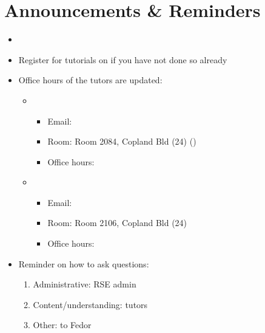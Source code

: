 \documentclass[letterpaper,10pt,english]{jupyterBook}
\begin{document}
\section{Announcements \& Reminders}
\label{\detokenize{02.optimization_intro:announcements-reminders}}\begin{itemize}
\item {} 
\sphinxAtStartPar
{}

\item {} 
\sphinxAtStartPar
Register for tutorials on  if you have not done so already

\item {} 
\sphinxAtStartPar
Office hours of the tutors are updated:
\begin{itemize}
\item {} 
\sphinxAtStartPar
{}
\begin{itemize}
\item {} 
\sphinxAtStartPar
Email: 

\item {} 
\sphinxAtStartPar
Room: Room 2084, Copland Bld (24) ()

\item {} 
\sphinxAtStartPar
Office hours: 

\end{itemize}

\item {} 
\sphinxAtStartPar
{}
\begin{itemize}
\item {} 
\sphinxAtStartPar
Email: 

\item {} 
\sphinxAtStartPar
Room: Room 2106, Copland Bld (24)

\item {} 
\sphinxAtStartPar
Office hours: 

\end{itemize}

\end{itemize}

\item {} 
\sphinxAtStartPar
Reminder on how to ask questions:
\begin{enumerate}
%
\item {} 
\sphinxAtStartPar
Administrative: RSE admin

\item {} 
\sphinxAtStartPar
Content/understanding: tutors

\item {} 
\sphinxAtStartPar
Other: to Fedor

\end{enumerate}

\end{itemize}
\end{document}
